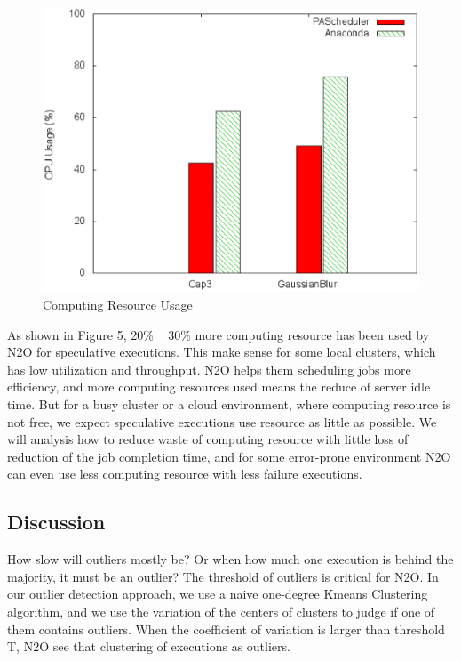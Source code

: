 \begin{figure}
\centering
\includegraphics[width=0.9\columnwidth]{figures/resource_usage.eps}
\caption{Computing Resource Usage}
\label{figure:resourceusage}
\end{figure}

As shown in Figure 5, 20\% ~ 30\% more computing resource has been used by N2O for speculative executions. This make sense for some local clusters, which has low utilization and throughput. N2O helps them scheduling jobs more efficiency, and more computing resources used means the reduce of server idle time. But for a busy cluster or a cloud environment, where computing resource is not free, we expect speculative executions use resource as little as possible. We will analysis how to reduce waste of computing resource with little loss of reduction of the job completion time, and for some error-prone environment N2O can even use less computing resource with less failure executions.

\subsection{Discussion}

How slow will outliers mostly be? Or when how much one execution is behind the majority, it must be an outlier? The threshold of outliers is critical for N2O. In our outlier detection approach, we use a naive one-degree Kmeans Clustering algorithm, and we use the variation of the centers of clusters to judge if one of them contains outliers. When the coefficient of variation is larger than threshold T, N2O see that clustering of executions as outliers.

